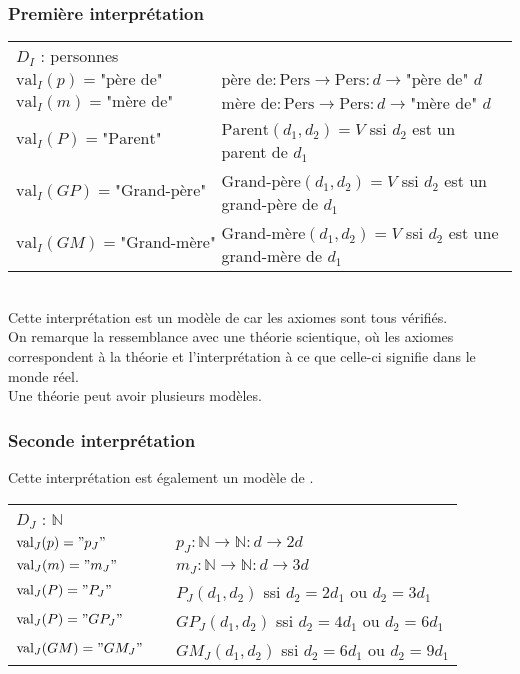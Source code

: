 \subsubsection{Première interprétation}
\begin{tabular}{lll}
$D_I$ : personnes&&\\
$\text{val}_I(p)=\text{"père de"}$ &\hspace*{1cm} &$\text{père de} : \text{Pers}\rightarrow\text{Pers} : d \rightarrow \text{"père de" }d$\\
$\text{val}_I(m)=\text{"mère de"}$ &\hspace*{1cm} &$\text{mère de} : \text{Pers}\rightarrow\text{Pers} : d \rightarrow \text{"mère de" }d$\\
$\text{val}_I(P)=\text{"Parent"}$ &\hspace*{1cm} &$\text{Parent}(d_1,d_2)=V$ ssi $d_2$ est un parent de $d_1$\\
$\text{val}_I(GP)=\text{"Grand-père"}$ &\hspace*{1cm} &$\text{Grand-père}(d_1,d_2)=V$ ssi $d_2$ est un grand-père de $d_1$\\
$\text{val}_I(GM)=\text{"Grand-mère"}$ &\hspace*{1cm} &$\text{Grand-mère}(d_1,d_2)=V$ ssi $d_2$ est une grand-mère de $d_1$\\
\end{tabular}\\

Cette interprétation est un modèle de  car les axiomes sont tous vérifiés.\\
On remarque la ressemblance avec une théorie scientique, où les axiomes correspondent à la théorie et l'interprétation à ce que celle-ci signifie dans le monde réel.\\
Une théorie peut avoir plusieurs modèles.\\ 
\subsubsection{Seconde interprétation}
Cette interprétation est également un modèle de .\\

\begin{tabular}{lll}
$D_J$ : $\mathbb{N}$&&\\
$\text{val}_J(p)="p_J"$ &\hspace*{1cm} &$p_J : \mathbb{N}\rightarrow\mathbb{N} : d \rightarrow 2d$\\
$\text{val}_J(m)="m_J"$ &\hspace*{1cm} &$m_J : \mathbb{N}\rightarrow\mathbb{N} : d \rightarrow 3d$\\
$\text{val}_J(P)="P_J"$ &\hspace*{1cm} &$P_J(d_1,d_2)$ ssi $d_2=2d_1$ ou $d_2=3d_1$\\
$\text{val}_J(P)="GP_J"$ &\hspace*{1cm} &$GP_J(d_1,d_2)$ ssi $d_2=4d_1$ ou $d_2=6d_1$\\
$\text{val}_J(GM)="GM_J"$ &\hspace*{1cm} &$GM_J(d_1,d_2)$ ssi $d_2=6d_1$ ou $d_2=9d_1$\\
\end{tabular}\\

